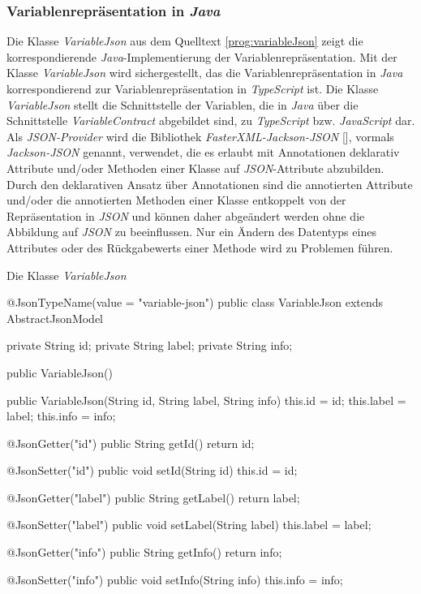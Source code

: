 \subsubsection{Variablenrepräsentation in \emph{Java}}
Die Klasse \emph{VariableJson} aus dem Quelltext \ref{prog:variableJson} zeigt die korrespondierende \emph{Java}-Implementierung der Variablenrepräsentation. Mit der Klasse \emph{VariableJson} wird sichergestellt, das die Variablenrepräsentation in \emph{Java} korrespondierend zur Variablenrepräsentation in \emph{TypeScript} ist.
\newline
\newline
Die Klasse \emph{VariableJson} stellt die Schnittstelle der Variablen, die in \emph{Java} über die Schnittstelle \emph{VariableContract} abgebildet sind, zu \emph{TypeScript} bzw. \emph{JavaScript} dar. Als \emph{JSON-Provider} wird die Bibliothek \emph{FasterXML-Jackson-JSON} [\cite{fasterXml}], vormals \emph{Jackson-JSON} genannt, verwendet, die es erlaubt mit Annotationen deklarativ Attribute und/oder Methoden einer Klasse auf \emph{JSON}-Attribute abzubilden. Durch den deklarativen Ansatz über Annotationen sind die annotierten  Attribute und/oder die annotierten Methoden einer Klasse entkoppelt von der Repräsentation in \emph{JSON} und können daher abgeändert werden ohne die Abbildung auf \emph{JSON} zu beeinflussen. Nur ein Ändern des Datentyps eines Attributes oder des Rückgabewerts einer Methode wird zu Problemen führen. 
\newline
\begin{program}
\caption{Die Klasse \emph{VariableJson}}
\label{prog:variableJson}
\begin{JsCode}
@JsonTypeName(value = "variable-json")
public class VariableJson extends AbstractJsonModel {

    private String id;
    private String label;
    private String info;

    public VariableJson() {
    }

    public VariableJson(String id, 
                        String label, 
                        String info) {
        this.id    = id;
        this.label = label;
        this.info  = info;
    }

    @JsonGetter("id")
    public String getId() { 
        return id; 
    }

    @JsonSetter("id")
    public void setId(String id) { 
        this.id = id; 
    }

    @JsonGetter("label")
    public String getLabel() { 
        return label; 
    }

    @JsonSetter("label")
    public void setLabel(String label) { 
        this.label = label; 
    }

    @JsonGetter("info")
    public String getInfo() { 
        return info; 
    }

    @JsonSetter("info")
    public void setInfo(String info) { 
        this.info = info; 
    }
    
}
\end{JsCode}
\end{program}
\ \newline

